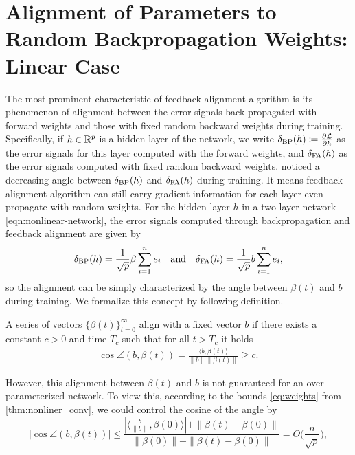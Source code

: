 
\section{Alignment of Parameters to Random Backpropagation Weights: Linear Case}\label{sec:alignment}

The most prominent characteristic of feedback alignment algorithm is its phenomenon of alignment between the error signals back-propagated with forward weights and those with fixed random backward weights during training. Specifically, if $h\in \mathbb{R}^p$ is a hidden layer of the network, we write $\delta_\mathrm{BP}(h) \coloneqq \frac{\partial \mathcal{L}}{\partial h}$ as the error signals for this layer computed with the forward weights, and $\delta_\mathrm{FA}(h)$ as the error signals computed with fixed random backward weights.
\citet{lillicrap2016random} noticed a decreasing angle between $\delta_\mathrm{BP}(h)$ and $\delta_\mathrm{FA}(h)$ during training. It means feedback alignment algorithm can still carry gradient information for each layer even propagate with random weights.
For the hidden layer $h$ in a two-layer network \eqref{eqn:nonlinear-network}, the error signals computed through backpropagation and feedback alignment are given by 
\begin{equation}
    \delta_\mathrm{BP}(h) = \frac{1}{\sqrt{p}}\beta\sum_{i=1}^ne_i \quad\text{and}\quad \delta_\mathrm{FA}(h) = \frac{1}{\sqrt{p}}b\sum_{i=1}^ne_i,
\end{equation}
so the alignment can be simply characterized by the angle between $\beta(t)$ and $b$ during training. We formalize this concept by following definition.
\begin{definition}\label{def:alignment}
    A series of vectors $\{\beta(t)\}_{t=0}^\infty$ align with a fixed vector $b$ if there exists a constant $c>0$ and time $T_c$ such that for all $t > T_c$ it holds
    \begin{align*}
        \cos\angle(b, \beta(t)) = \frac{\langle b, \beta(t)\rangle}{\|b\|\|\beta(t)\|} \geq c.
    \end{align*}
\end{definition}
However, this alignment between $\beta(t)$ and $b$ is not guaranteed for an over-parameterized network. To view this, according to the bounds \eqref{eq:weights} from \cref{thm:nonliner_conv}, we could control the cosine of the angle by
\begin{equation}
\Big|\cos\angle(b, \beta(t))\Big| \leq \frac{|\langle \frac{b}{\|b\|}, \beta(0)\rangle|+ \|\beta(t)- \beta(0)\|}{\|\beta(0)\|-\|\beta(t)-\beta(0)\|} = O\big(\frac{n}{\sqrt p}\big),
\end{equation}
